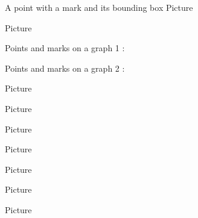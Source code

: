 A point with a mark and its bounding box
Picture 
\Huge

\begin{center}
   
\end{center}
\normalsize



Picture 
\begin{center}

\end{center}


Points and marks on a graph 1 :

\begin{center}

\end{center}


Points and marks on a graph 2 :

\begin{center}

\end{center}


\begin{center}

\end{center}



Picture 
\begin{center}
   
\end{center}



Picture 
\begin{center}

\end{center}


Picture 
\begin{center}
   
\end{center}


Picture 
\begin{center}
   
\end{center}


Picture 
\begin{center}
   
\end{center}



Picture 
\begin{center}
   
\end{center}
   

Picture 
\begin{center}
   
\end{center}
   
